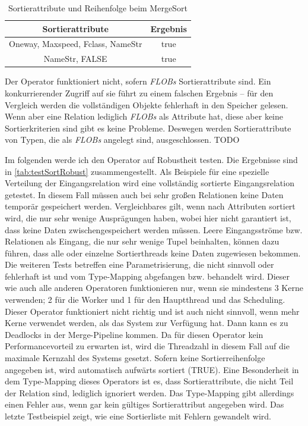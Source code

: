 \documentclass[a4paper,12pt,twoside]{article}
\newcommand{\Fb}[1]{\textit{#1}} %
\begin{document}

\begin{table}
	\centering
	\begin{tabular}{|c|c|}
		\hline 
		Sortierattribute & Ergebnis \\ 
		\hline 
		 Oneway, Maxspeed, Fclass, NameStr &  true \\ 
		\hline 
		NameStr, FALSE &  true \\ 
		\hline 
	\end{tabular}
	\caption{\label{tab:testSortAttr} Sortierattribute und Reihenfolge beim MergeSort}
\end{table}


Der Operator funktioniert nicht, sofern \Fb{FLOBs} Sortierattribute sind. Ein konkurrierender Zugriff auf sie führt zu einem falschen Ergebnis -- für den Vergleich werden die vollständigen Objekte fehlerhaft in den Speicher gelesen. Wenn aber eine Relation lediglich \Fb{FLOBs} als Attribute hat, diese aber keine Sortierkriterien sind gibt es keine Probleme. Deswegen werden Sortierattribute von Typen, die als \Fb{FLOBs} angelegt sind, ausgeschlossen. TODO

Im folgenden werde ich den Operator auf Robustheit testen. Die Ergebnisse sind in \autoref{tab:testSortRobust} zusammengestellt. Als Beispiele für eine spezielle Verteilung der Eingangsrelation wird eine vollständig sortierte Eingangsrelation getestet. In diesem Fall müssen auch bei sehr großen Relationen keine Daten temporär gespeichert werden. Vergleichbares gilt, wenn nach Attributen sortiert wird, die nur sehr wenige Ausprägungen haben, wobei hier nicht garantiert ist, dass keine Daten zwischengespeichert werden müssen. Leere Eingangsströme bzw. Relationen als Eingang, die nur sehr wenige Tupel beinhalten, können dazu führen, dass alle oder einzelne Sortierthreads keine Daten zugewiesen bekommen. Die weiteren Tests betreffen eine Parametrisierung, die nicht sinnvoll oder fehlerhaft ist und vom Type-Mapping abgefangen bzw. behandelt wird. Dieser wie auch alle anderen Operatoren funktionieren nur, wenn sie mindestens 3 Kerne verwenden; 2 für die Worker und 1 für den Hauptthread und das Scheduling. Dieser Operator funktioniert nicht richtig und ist auch nicht sinnvoll, wenn mehr Kerne verwendet werden, als das System zur Verfügung hat. Dann kann es zu Deadlocks in der Merge-Pipeline kommen. Da für diesen Operator kein Performancevorteil zu erwarten ist, wird die Threadzahl in diesem Fall auf die maximale Kernzahl des Systems gesetzt. Sofern keine Sortierreihenfolge angegeben ist, wird automatisch aufwärts sortiert (TRUE). Eine Besonderheit in dem Type-Mapping dieses Operators ist es, dass Sortierattribute, die nicht Teil der Relation sind, lediglich ignoriert werden. Das Type-Mapping gibt allerdings einen Fehler aus, wenn gar kein gültiges Sortierattribut angegeben wird. Das letzte Testbeispiel zeigt, wie eine Sortierliste mit Fehlern gewandelt wird.
\end{document}
